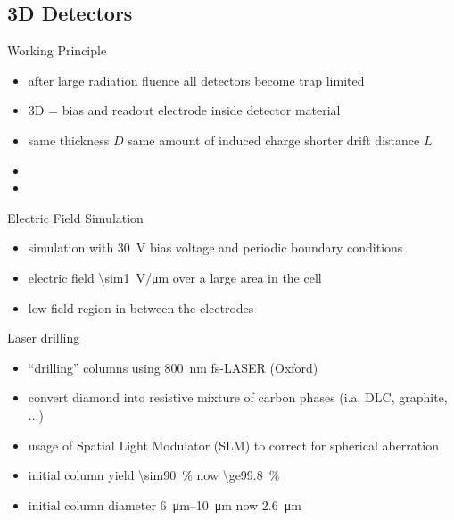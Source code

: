 \subsection{3D Detectors}
\begin{frame}{Working Principle}

	\vspace*{-10pt}\vspace*{-10pt}
	
	\begin{itemize}\itemfill
		\item after large radiation fluence all detectors become trap limited
		\item 3D = bias and readout electrode inside detector material
		\item same thickness $D$ \ra same amount of induced charge \ra shorter drift distance $L$
		\item {}
		\item {}
	\end{itemize}

\end{frame}
\begin{frame}{Electric Field Simulation}

	\vspace*{-10pt}
	
	\begin{itemize}\itemfill
		\item simulation with \SI{30}{\volt} bias voltage and periodic boundary conditions
		\item electric field \SI{\sim1}{\volt/\micro\meter} over a large area in the cell
		\item low field region in between the electrodes
	\end{itemize}

\end{frame}


\begin{frame}{Laser drilling}

	\begin{itemize}\itemfill
		\item ``drilling'' columns using \SI{800}{\nano\meter} fs-LASER (Oxford)
		\item convert diamond into resistive mixture of carbon phases (i.a. DLC, graphite, ...)
		\item usage of Spatial Light Modulator (SLM) to correct for spherical aberration
		\item initial column yield \SI{\sim90}{\%} \ra now \SI{\ge99.8}{\%}
		\item  initial column diameter \SIrange{6}{10}{\micro\meter} \ra now \SI{2.6}{\micro\meter}
	\end{itemize}
	
	\vspace*{-10pt}
	
\end{frame}

